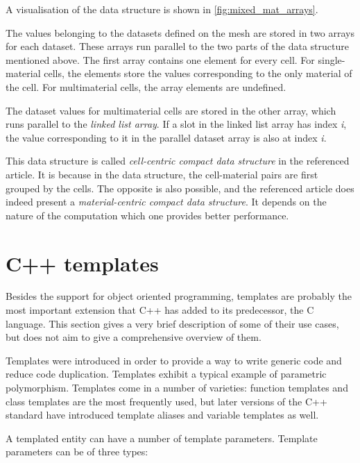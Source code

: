 \documentclass[fontsize=11pt, appendixprefix=true]{scrreprt}
\begin{document}
A visualisation of the data structure is shown in
\autoref{fig:mixed_mat_arrays}.

The values belonging to the datasets defined on the mesh are stored in two
arrays for each dataset. These arrays run parallel to the two parts of the data
structure mentioned above. The first array contains one element for every
cell. For single-material cells, the elements store the values corresponding to
the only material of the cell. For multimaterial cells, the array elements are
undefined.

The dataset values for multimaterial cells are stored in the other array, which
runs parallel to the \textit{linked list array}. If a slot in the linked list
array has index \textit{i}, the value corresponding to it in the parallel
dataset array is also at index \textit{i}.

This data structure is called \textit{cell-centric compact data structure} in
the referenced article. It is because in the data structure, the cell-material
pairs are first grouped by the cells. The opposite is also possible, and the
referenced article does indeed present a \textit{material-centric compact data
  structure}. It depends on the nature of the computation which one provides
better performance.

\section{C++ templates}

Besides the support for object oriented programming, templates are probably the
most important extension that C++ has added to its predecessor, the C
language. This section gives a very brief description of some of their use
cases, but does not aim to give a comprehensive overview of them.

Templates were introduced in order to provide a way to write generic code and
reduce code duplication. Templates exhibit a typical example of parametric
polymorphism. Templates come in a number of varieties: function templates and
class templates are the most frequently used, but later versions of the C++
standard have introduced template aliases and variable templates as well.

A templated entity can have a number of template parameters. Template parameters
can be of three types:
\end{document}

